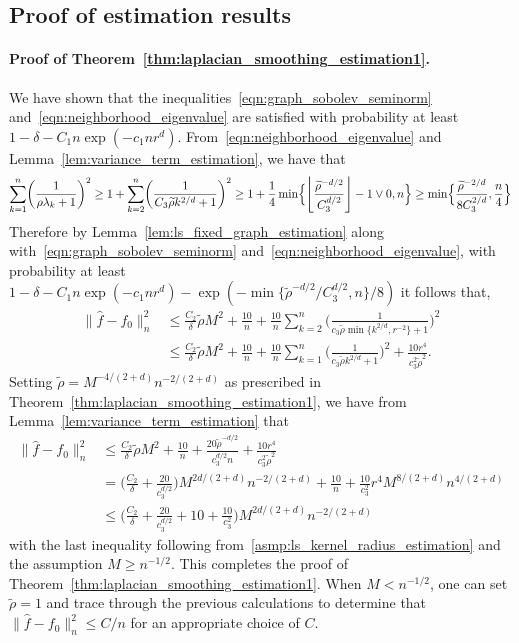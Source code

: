 \documentclass[twoside]{article}
\newcommand{\floor}[1]{\left\lfloor #1 \right\rfloor}
\newcommand{\1}{\mathbf{1}}
\newcommand{\wt}[1]{\widetilde{#1}}
\newcommand{\wh}[1]{\widehat{#1}}
\theoremstyle{definition}
\theoremstyle{remark}
\begin{document}
\subsection{Proof of estimation results}
\label{subsec:laplacian_smoothing_estimation1_pf}

\paragraph{Proof of Theorem~\ref{thm:laplacian_smoothing_estimation1}.}
We have shown that the inequalities~\eqref{eqn:graph_sobolev_seminorm} and~\eqref{eqn:neighborhood_eigenvalue} are satisfied with probability at least $1 - \delta - C_1n\exp(-c_1nr^d)$. From~\eqref{eqn:neighborhood_eigenvalue} and Lemma~\ref{lem:variance_term_estimation}, we have that
\begin{equation*}
\sum_{k = 1}^{n}\biggl(\frac{1}{\rho \lambda_k + 1}\biggr)^{2} \geq 1 + \sum_{k = 2}^{n}\biggl(\frac{1}{C_3 \wt{\rho} k^{2/d} + 1}\biggr)^{2} \geq 1 + \frac{1}{4} \min\Bigl\{\floor{\frac{\wt{\rho}^{-d/2}}{C_3^{d/2}}} - 1 \vee 0,n\Bigr\} \geq \min\Bigl\{\frac{\wt{\rho}^{-2/d}}{8C_3^{2/d}}, \frac{n}{4} \Bigr\}
\end{equation*}
Therefore by Lemma~\ref{lem:ls_fixed_graph_estimation} along with~\eqref{eqn:graph_sobolev_seminorm} and~\eqref{eqn:neighborhood_eigenvalue}, with probability at least $1 - \delta - C_1n\exp(-c_1nr^d) - \exp(-\min\{\wt{\rho}^{-d/2}/C_3^{d/2},n\}/8)$ it follows that,
\begin{align}
\|\wh{f} - f_0\|_n^2 & \leq \frac{C_2}{\delta} \wt{\rho} M^2 + \frac{10}{n} + \frac{10}{n}\sum_{k = 2}^{n} \Biggl(\frac{1}{c_3 \wt{\rho}\min\{k^{2/d},r^{-2}\} + 1}\Biggr)^2 \nonumber \\
& \leq \frac{C_2}{\delta} \wt{\rho} M^2 + \frac{10}{n} + \frac{10}{n}\sum_{k = 1}^{n} \biggl(\frac{1}{c_3 \wt{\rho}k^{2/d} + 1}\biggr)^2 + \frac{10r^4}{c_3^2 \wt{\rho}^2}. \label{pf:laplacian_smoothing_estimation1_1}
\end{align}
Setting $\wt{\rho} = M^{-4/(2 + d)}n^{-2/(2 + d)}$ as prescribed in Theorem~\ref{thm:laplacian_smoothing_estimation1},  we have from Lemma~\ref{lem:variance_term_estimation} that
\begin{align*}
\|\wh{f} - f_0\|_n^2 & \leq\frac{C_2}{\delta} \wt{\rho} M^2 + \frac{10}{n} + \frac{20\wt{\rho}^{-d/2}}{c_3^{d/2}n}  + \frac{10r^4}{c_3^2 \wt{\rho}^2} \\
& = \biggl(\frac{C_2}{\delta} + \frac{20}{c_3^{d/2}}\biggr)M^{2d/(2+d)} n^{-2/(2 + d)} + \frac{10}{n} + \frac{10}{c_3^2}r^4M^{8/(2 + d)}n^{4/(2 + d)} \\
& \leq \biggl(\frac{C_2}{\delta} + \frac{20}{c_3^{d/2}} + 10 + \frac{10}{c_3^2}\biggr)M^{2d/(2+d)} n^{-2/(2 + d)}
\end{align*}
with the last inequality following from~\ref{asmp:ls_kernel_radius_estimation} and the assumption $M \geq n^{-1/2}$. This completes the proof of Theorem~\ref{thm:laplacian_smoothing_estimation1}. When $M < n^{-1/2}$, one can set $\wt{\rho} = 1$ and trace through the previous calculations to determine that $\|\wh{f} - f_0\|_n^2 \leq C/n$ for an appropriate choice of $C$.
\end{document}
